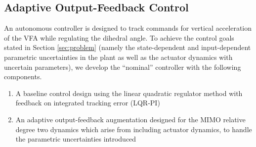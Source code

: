 \documentclass[english]{ifacconf}
\begin{document}

\subsection{Adaptive Output-Feedback Control}\label{subsec:sc_adaptive}
%
An autonomous controller is designed  to track commands for vertical acceleration of the VFA while regulating the dihedral angle. To achieve the control goals stated in Section \ref{sec:problem} (namely the state-dependent and input-dependent parametric uncertainties in the plant as well as the actuator dynamics with uncertain parameters), we develop the ``nominal'' controller with the following components.
\begin{enumerate}
	\item A baseline control design using the linear quadratic regulator method with feedback on integrated tracking error (LQR-PI)
	\item An adaptive output-feedback augmentation designed for the MIMO relative degree two dynamics which arise from including actuator dynamics, to handle the parametric uncertainties introduced
\end{enumerate}
\end{document}

